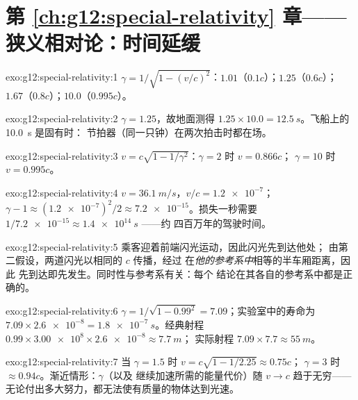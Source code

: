 \section*{第 \ref{ch:g12:special-relativity} 章——狭义相对论：时间延缓}

\begin{solution}{exo:g12:special-relativity:1}
$\gamma = 1/\sqrt{1 - (v/c)^2}$：$1.01$（$0.1c$）；$1.25$（$0.6c$）；
$1.67$（$0.8c$）；$10.0$（$0.995c$）。
\end{solution}

\begin{solution}{exo:g12:special-relativity:2}
$\gamma = 1.25$，故地面测得 $1.25 \times 10.0 =
\qty{12.5}{s}$。飞船上的 \qty{10.0}{s} 是固有时：
节拍器（同一只钟）在两次拍击时都在场。
\end{solution}

\begin{solution}{exo:g12:special-relativity:3}
$v = c\sqrt{1 - 1/\gamma^2}$：$\gamma = 2$ 时 $v = 0.866c$；
$\gamma = 10$ 时 $v = 0.995c$。
\end{solution}

\begin{solution}{exo:g12:special-relativity:4}
$v = \qty{36.1}{m/s}$，$v/c = \num{1.2e-7}$；
$\gamma - 1 \approx (\num{1.2e-7})^2/2 \approx \num{7.2e-15}$。损失一秒需要
$1/\num{7.2e-15} \approx \qty{1.4e14}{s}$ ——约
四百万年的驾驶时间。
\end{solution}

\begin{solution}{exo:g12:special-relativity:5}
乘客迎着前端闪光运动，因此闪光先到达他处；
由第二假设，两道闪光以相同的 $c$ 传播，经过
在\emph{他的参考系中}相等的半车厢距离，因此
先到达即先发生。同时性与参考系有关：每个
结论在其各自的参考系中都是正确的。
\end{solution}

\begin{solution}{exo:g12:special-relativity:6}
$\gamma = 1/\sqrt{1 - 0.99^2} = 7.09$；实验室中的寿命为
$7.09 \times \num{2.6e-8} = \qty{1.8e-7}{s}$。经典射程
$0.99 \times \num{3.00e8} \times \num{2.6e-8} \approx \qty{7.7}{m}$；
实际射程 $7.09 \times 7.7 \approx \qty{55}{m}$。
\end{solution}

\begin{solution}{exo:g12:special-relativity:7}
当 $\gamma = 1.5$ 时 $v = c\sqrt{1 - 1/2.25} \approx 0.75c$；
$\gamma = 3$ 时 $\approx 0.94c$。渐近情形：$\gamma$（以及
继续加速所需的能量代价）随 $v \to c$ 趋于无穷——
无论付出多大努力，都无法使有质量的物体达到光速。
\end{solution}

